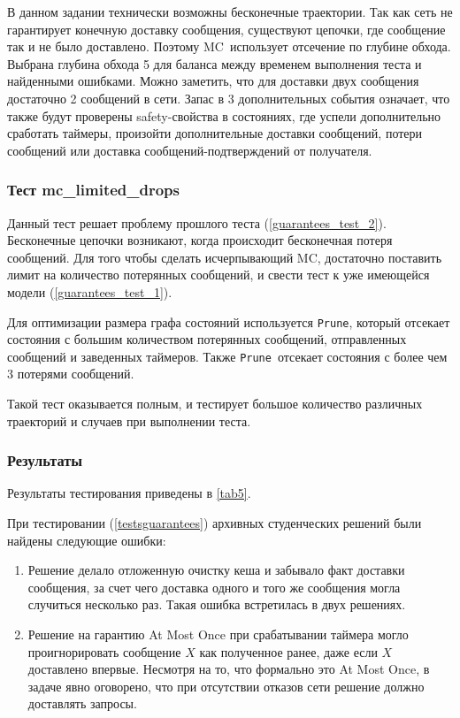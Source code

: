 \documentclass[a4paper,12pt]{extarticle}
\newcommand{\prune}[0]{\texttt{Prune}}
\newcommand{\mc}[0]{MC}
\begin{document}
В данном задании технически возможны бесконечные траектории.
Так как сеть не гарантирует конечную доставку сообщения, существуют цепочки, где сообщение так и не было доставлено.
Поэтому \mc\ использует отсечение по глубине обхода.
Выбрана глубина обхода 5 для баланса между временем выполнения теста и найденными ошибками.
Можно заметить, что для доставки двух сообщения достаточно 2 сообщений в сети.
Запас в 3 дополнительных события означает, что также будут проверены safety-свойства в состояниях, где успели дополнительно сработать таймеры, произойти дополнительные доставки сообщений, потери сообщений или доставка сообщений-подтверждений от получателя.

\subsubsection{Тест mc\_limited\_drops}
\label{guarantees_test_3}

Данный тест решает проблему прошлого теста (\cref{guarantees_test_2}).
Бесконечные цепочки возникают, когда происходит бесконечная потеря сообщений.
Для того чтобы сделать исчерпывающий \mc, достаточно поставить лимит на количество потерянных сообщений, и свести тест к уже имеющейся модели (\cref{guarantees_test_1}).

Для оптимизации размера графа состояний используется \prune, который отсекает состояния с большим количеством  потерянных сообщений, отправленных сообщений и заведенных таймеров.
Также \prune\ отсекает состояния с более чем 3 потерями сообщений.

Такой тест оказывается полным, и тестирует большое количество различных траекторий и случаев при выполнении теста.


\subsubsection{Результаты}

Результаты тестирования приведены в \cref{tab5}.

При тестировании (\cref{testsguarantees}) архивных студенческих решений были найдены следующие ошибки:
\begin{enumerate}
    \item Решение делало отложенную очистку кеша и забывало факт доставки сообщения, за счет чего доставка одного и того же сообщения могла случиться несколько раз.
Такая ошибка встретилась в двух решениях.
    \item Решение на гарантию At Most Once при срабатывании таймера могло проигнорировать сообщение $X$ как полученное ранее, даже если $X$ доставлено впервые.
Несмотря на то, что формально это At Most Once, в задаче явно оговорено, что при отсутствии отказов сети решение должно доставлять запросы.
\end{enumerate} 
\end{document}
